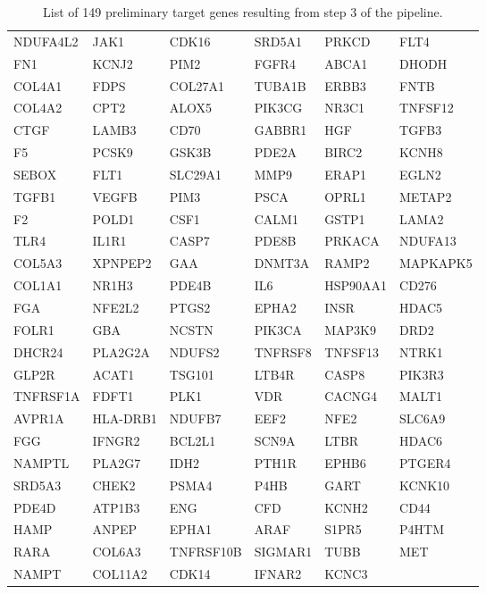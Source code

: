 \documentclass[fleqn,10pt]{SelfArx} %
\begin{document}
\setcounter{table}{0}
\renewcommand{\thetable}{S\arabic{table}}
\renewcommand{\arraystretch}{1.2}

\begin{table}[!htb]
	\centering
	\scriptsize
	\begin{tabularx}{\textwidth}{XXXXXX}
		NDUFA4L2 & JAK1 & CDK16 & SRD5A1 & PRKCD & FLT4 \\ 
		FN1 & KCNJ2 & PIM2 & FGFR4 & ABCA1 & DHODH \\ 
		COL4A1 & FDPS & COL27A1 & TUBA1B & ERBB3 & FNTB \\ 
		COL4A2 & CPT2 & ALOX5 & PIK3CG & NR3C1 & TNFSF12 \\ 
		CTGF & LAMB3 & CD70 & GABBR1 & HGF & TGFB3 \\ 
		F5 & PCSK9 & GSK3B & PDE2A & BIRC2 & KCNH8 \\ 
		SEBOX & FLT1 & SLC29A1 & MMP9 & ERAP1 & EGLN2 \\ 
		TGFB1 & VEGFB & PIM3 & PSCA & OPRL1 & METAP2 \\ 
		F2 & POLD1 & CSF1 & CALM1 & GSTP1 & LAMA2 \\ 
		TLR4 & IL1R1 & CASP7 & PDE8B & PRKACA & NDUFA13 \\ 
		COL5A3 & XPNPEP2 & GAA & DNMT3A & RAMP2 & MAPKAPK5 \\ 
		COL1A1 & NR1H3 & PDE4B & IL6 & HSP90AA1 & CD276 \\ 
		FGA & NFE2L2 & PTGS2 & EPHA2 & INSR & HDAC5 \\ 
		FOLR1 & GBA & NCSTN & PIK3CA & MAP3K9 & DRD2 \\ 
		DHCR24 & PLA2G2A & NDUFS2 & TNFRSF8 & TNFSF13 & NTRK1 \\ 
		GLP2R & ACAT1 & TSG101 & LTB4R & CASP8 & PIK3R3 \\ 
		TNFRSF1A & FDFT1 & PLK1 & VDR & CACNG4 & MALT1 \\ 
		AVPR1A & HLA-DRB1 & NDUFB7 & EEF2 & NFE2 & SLC6A9 \\ 
		FGG & IFNGR2 & BCL2L1 & SCN9A & LTBR & HDAC6 \\ 
		NAMPTL & PLA2G7 & IDH2 & PTH1R & EPHB6 & PTGER4 \\ 
		SRD5A3 & CHEK2 & PSMA4 & P4HB & GART & KCNK10 \\ 
		PDE4D & ATP1B3 & ENG & CFD & KCNH2 & CD44 \\ 
		HAMP & ANPEP & EPHA1 & ARAF & S1PR5 & P4HTM \\ 
		RARA & COL6A3 & TNFRSF10B & SIGMAR1 & TUBB & MET \\ 
		NAMPT & COL11A2 & CDK14 & IFNAR2 & KCNC3 &  \\ 
	\end{tabularx}
	\smallskip
	\caption{List of 149 preliminary target genes resulting from step 3 of the pipeline.}
	\label{tab:149genes}
\end{table}
\end{document}
